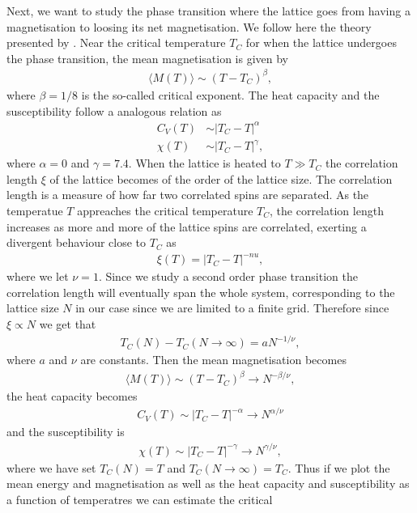 \documentclass[twocolumn]{aastex62}
\begin{document}
Next, we want to study the phase transition where the lattice goes from having a
magnetisation to loosing its net magnetisation. We follow here the theory presented
by \cite{jensen:2019}. Near the critical temperature
$T_C$ for when the lattice undergoes the phase transition, the mean magnetisation is
given by 
\begin{align}
	\langle M(T) \rangle \sim (T-T_C)^\beta,
\end{align}
where $\beta = 1/8$ is the so-called critical exponent. The heat capacity and
the susceptibility follow a analogous relation as
\begin{align}
	C_V(T) &\sim |T_C - T|^\alpha \\
	\chi(T) &\sim |T_C - T|^\gamma,
\end{align}
where $\alpha = 0$ and $\gamma = 7.4$. When the lattice is heated to $T \gg T_C$
the correlation length $\xi$ of the lattice becomes of the order of the lattice size.
The correlation length is a measure of how far two correlated spins are
separated. As the temperatue $T$ appreaches the critical temperature $T_C$, the
correlation length increases as more and more of the lattice spins are correlated, exerting a divergent behaviour close to $T_C$ as 
\begin{align}
	\xi(T) = |T_C - T|^{-nu},
\end{align}
where we let $\nu = 1$. Since we study a second order phase transition the
correlation length will eventually span the whole system, corresponding to the
lattice size $N$ in our case since we are limited to a finite grid. Therefore since
$\xi\propto N$ we get that 
\begin{align}
	T_C(N) - T_C(N\to\infty) = aN^{-1/\nu},
	\label{eq:temp_crit}
\end{align}
where $a$ and $\nu$ are constants. Then the mean magnetisation becomes 
\begin{align}
	\langle M(T)\rangle \sim (T - T_C)^\beta \to N^{-\beta/\nu},
\end{align}
the heat capacity becomes 
\begin{align}
	C_V(T) \sim |T_C - T|^{-\alpha}\to N^{\alpha / \nu}
\end{align}
and the susceptibility is 
\begin{align}
	\chi(T)\sim |T_C - T|^{-\gamma} \to N^{\gamma/\nu},
\end{align}
where we have set $T_C(N) = T$ and $T_C(N\to\infty) = T_C$.
Thus if we plot the mean energy and magnetisation as well as the heat capacity
and susceptibility as a function of temperatres we can estimate the critical
\end{document}
